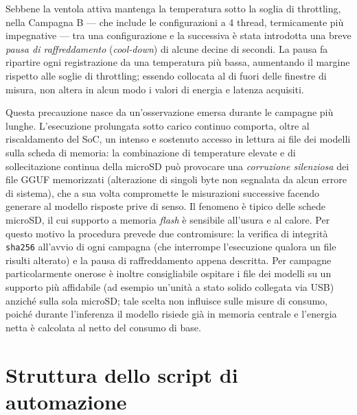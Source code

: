 Sebbene la ventola attiva mantenga la temperatura sotto la soglia di throttling,
nella Campagna B --- che include le configurazioni a 4 thread, termicamente più
impegnative --- tra una configurazione e la successiva è stata introdotta una breve
\textit{pausa di raffreddamento} (\textit{cool-down}) di alcune decine di secondi. La pausa fa
ripartire ogni registrazione da una temperatura più bassa, aumentando il margine
rispetto alle soglie di throttling; essendo collocata al di fuori delle finestre di
misura, non altera in alcun modo i valori di energia e latenza acquisiti.

Questa precauzione nasce da un'osservazione emersa durante le campagne più lunghe.
L'esecuzione prolungata sotto carico continuo comporta, oltre al riscaldamento del
SoC, un intenso e sostenuto accesso in lettura ai file dei modelli sulla scheda di
memoria: la combinazione di temperature elevate e di sollecitazione continua della
microSD può provocare una \emph{corruzione silenziosa} dei file GGUF memorizzati
(alterazione di singoli byte non segnalata da alcun errore di sistema), che a sua
volta compromette le misurazioni successive facendo generare al modello risposte
prive di senso. Il fenomeno è tipico delle schede microSD, il cui supporto a memoria
\textit{flash} è sensibile all'usura e al calore. Per questo motivo la procedura
prevede due contromisure: la verifica di integrità \texttt{sha256} all'avvio di ogni
campagna (che interrompe l'esecuzione qualora un file risulti alterato) e la pausa di
raffreddamento appena descritta. Per campagne particolarmente onerose è inoltre
consigliabile ospitare i file dei modelli su un supporto più affidabile (ad esempio
un'unità a stato solido collegata via USB) anziché sulla sola microSD; tale scelta non
influisce sulle misure di consumo, poiché durante l'inferenza il modello risiede già
in memoria centrale e l'energia netta è calcolata al netto del consumo di base.

\section{Struttura dello script di automazione}

